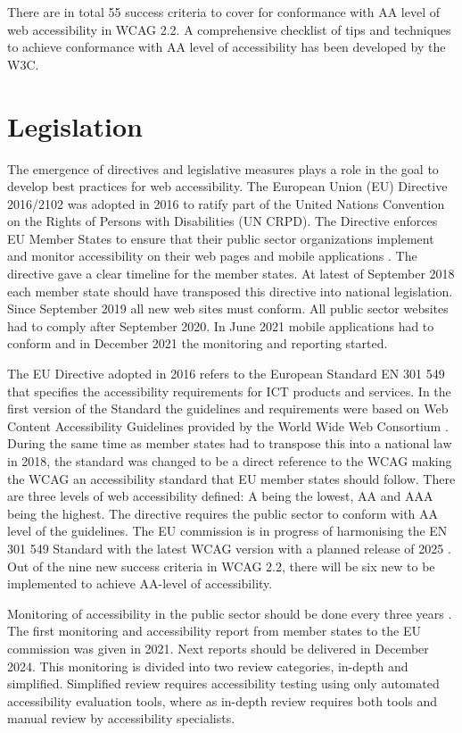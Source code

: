There are in total 55 success criteria to cover for conformance with AA level of web accessibility in WCAG 2.2. A comprehensive checklist \citep{wcag_checklist} of tips and techniques to achieve conformance with AA level of accessibility has been developed by the W3C.


\section{Legislation}

The emergence of directives and legislative measures plays a role in the goal to develop best practices for web accessibility. The European Union (EU) Directive 2016/2102 was adopted in 2016 to ratify part of the United Nations Convention on the Rights of Persons with Disabilities (UN CRPD). The Directive enforces EU Member States to ensure that their public sector organizations implement and monitor accessibility on their web pages and mobile applications \citep{eudirective2016}. The directive gave a clear timeline for the member states. At latest of September 2018 each member state should have transposed this directive into national legislation. Since September 2019 all new web sites must conform. All public sector websites had to comply after September 2020. In June 2021 mobile applications had to conform and in December 2021 the monitoring and reporting started. 

The EU Directive adopted in 2016 refers to the European Standard EN 301 549 that specifies the accessibility requirements for ICT products and services. In the first version of the Standard the guidelines and requirements were based on Web Content Accessibility Guidelines provided by the World Wide Web Consortium \citep{wcagadoptioneurope}. During the same time as member states had to transpose this into a national law in 2018, the standard was changed to be a direct reference to the WCAG making the WCAG an accessibility standard that EU member states should follow. There are three levels of web accessibility defined: A being the lowest, AA and AAA being the highest. The directive requires the public sector to conform with AA level of the guidelines. The EU commission is in progress of harmonising the EN 301 549 Standard with the latest WCAG version with a planned release of 2025 \citep{etsi_standard}. Out of the nine new success criteria in WCAG 2.2, there will be six new to be implemented to achieve AA-level of accessibility.

Monitoring of accessibility in the public sector should be done every three years \citep{eudirectivemonitoring}. The first monitoring and accessibility report from member states to the EU commission was given in 2021. Next reports should be delivered in December 2024. This monitoring is divided into two review categories, in-depth and simplified. Simplified review requires accessibility testing using only automated accessibility evaluation tools, where as in-depth review requires both tools and manual review by accessibility specialists. 

